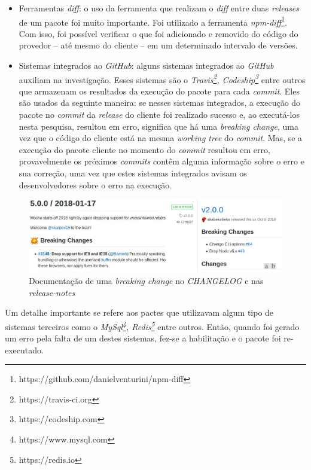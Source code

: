 \begin{itemize}
    \item Ferramentas \textit{diff}: o uso da ferramenta que realizam o  \textit{diff} entre duas \textit{releases} de um pacote foi muito importante. Foi utilizado a ferramenta \textit{npm-diff}\footnote{https://github.com/danielventurini/npm-diff}. Com isso, foi possível verificar o que foi adicionado e removido do código do provedor -- até mesmo do cliente -- em um determinado intervalo de versões.

    \item Sistemas integrados ao \textit{GitHub}: alguns sistemas integrados ao \textit{GitHub} auxiliam na investigação. Esses sistemas são o \textit{Travis\footnote{https://travis-ci.org}, Codeship\footnote{https://codeship.com}} entre outros que armazenam os resultados da execução do pacote para cada \textit{commit}. Eles são usados da seguinte maneira: se nesses sistemas integrados, a execução do pacote no \textit{commit} da \textit{release} do cliente foi realizado sucesso e, ao executá-los nesta pesquisa, resultou em erro, significa que há uma \textit{breaking change}, uma vez que o código do cliente está na mesma \textit{working tree} do \textit{commit}. Mas, se a execução do pacote cliente no momento do \textit{commit} resultou em erro, provavelmente os próximos \textit{commits} contêm alguma informação sobre o erro e sua correção, uma vez que estes sistemas integrados avisam os desenvolvedores sobre o erro na execução.
\end{itemize}

\begin{figure}
    \centering
    \includegraphics[scale=0.45]{figuras/bc_documentation.jpeg}
    \caption{Documentação de uma \textit{breaking change} no \textit{CHANGELOG} e nas \textit{release-notes}}
    \label{fig:bc_documentation}
\end{figure}{}


Um detalhe importante se refere aos pactes que utilizavam algum tipo de sistemas terceiros como o \textit{MySql\footnote{https://www.mysql.com}, Redis\footnote{https://redis.io}} entre outros. Então, quando foi gerado um erro pela falta de um destes sistemas, fez-se a habilitação e o pacote foi re-executado.

